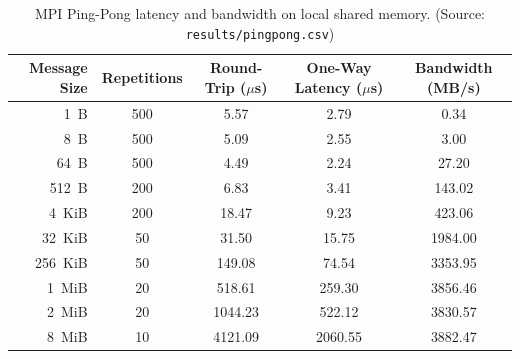 \begin{table}[htbp]
\centering
\footnotesize
\setlength{\tabcolsep}{4pt}
\caption{MPI Ping-Pong latency and bandwidth on local shared memory. (Source: \texttt{results/pingpong.csv})}
\label{tab:pingpong}
\begin{tabular}{rcccc}
\toprule
\textbf{Message Size} & \textbf{Repetitions} & \textbf{Round-Trip} ($\mu$s) & \textbf{One-Way Latency} ($\mu$s) & \textbf{Bandwidth} (MB/s) \\
\midrule
1~B & 500 & 5.57 & 2.79 & 0.34 \\
8~B & 500 & 5.09 & 2.55 & 3.00 \\
64~B & 500 & 4.49 & 2.24 & 27.20 \\
512~B & 200 & 6.83 & 3.41 & 143.02 \\
4~KiB & 200 & 18.47 & 9.23 & 423.06 \\
32~KiB & 50 & 31.50 & 15.75 & 1984.00 \\
256~KiB & 50 & 149.08 & 74.54 & 3353.95 \\
1~MiB & 20 & 518.61 & 259.30 & 3856.46 \\
2~MiB & 20 & 1044.23 & 522.12 & 3830.57 \\
8~MiB & 10 & 4121.09 & 2060.55 & 3882.47 \\
\bottomrule
\end{tabular}
\end{table}
